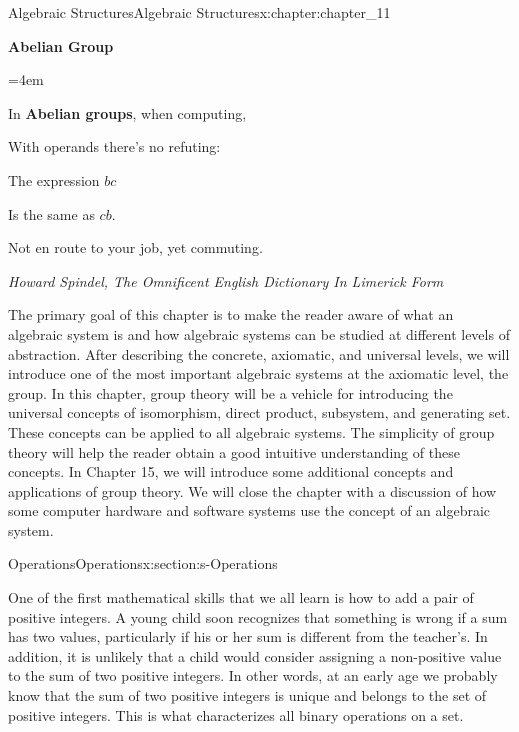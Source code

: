 \documentclass[oneside,10pt,]{book}
\newcommand{\terminology}[1]{\textbf{#1}}
\numberwithin{equation}{section}
\newenvironment{poem}{\setlength{\parindent}{0em}}{}
\newcommand{\poemTitle}[1]{\begin{center}\large\textbf{#1}\end{center}}
\newenvironment{stanza}{\vspace{0.25 em}\hangindent=4em}{\vspace{1 em}}
\newcommand{\poemauthorleft}[1]{\vspace{-1em}\begin{flushleft}\textit{#1}\end{flushleft}}
\newcommand{\poemlineleft}[1]{{\raggedright{#1}\par}\vspace{-\parskip}}
\begin{document}
\begin{chapterptx}{Algebraic Structures}{}{Algebraic Structures}{}{}{x:chapter:chapter_11}
\begin{introduction}{}%
\begin{poem}%
\poemTitle{Abelian Group}
\begin{stanza}
\poemlineleft{In \terminology{Abelian groups}, when computing,}
\poemlineleft{With operands there's no refuting:}
\poemlineleft{The expression \(bc\)}
\poemlineleft{Is the same as \(cb\).}
\poemlineleft{Not en route to your job, yet commuting.}
\end{stanza}
\poemauthorleft{Howard Spindel, The Omnificent English Dictionary In Limerick Form}
\end{poem}
The primary goal of this chapter is to make the reader aware of what an algebraic system is and how algebraic systems can be studied at different levels of abstraction. After describing the concrete, axiomatic, and universal levels, we will introduce one of the most important algebraic systems at the axiomatic level, the group. In this chapter, group theory will be a vehicle for introducing the universal concepts of isomorphism, direct product, subsystem, and generating set. These concepts can be applied to all algebraic systems. The simplicity of group theory will help the reader obtain a good intuitive understanding of these concepts. In Chapter 15, we will introduce some additional concepts and applications of group theory. We will close the chapter with a discussion of how some computer hardware and software systems use the concept of an algebraic system.%
\end{introduction}%
%
%
\typeout{************************************************}
\typeout{************************************************}
%
\begin{sectionptx}{Operations}{}{Operations}{}{}{x:section:s-Operations}
%
\begin{introduction}{}%
One of the first mathematical skills that we all learn is how to add a pair of positive integers. A young child soon recognizes that something is wrong if a sum has two values, particularly if his or her sum is different from the teacher's. In addition, it is unlikely that a child would consider assigning a non-positive value to the sum of two positive integers. In other words, at an early age we probably know that the sum of two positive integers is unique and belongs to the set of positive integers. This is what characterizes all binary operations on a set.%

\end{introduction}
\end{sectionptx}
\end{chapterptx}
\end{document}
